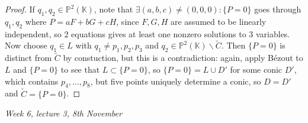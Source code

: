 \documentclass{article}
\newcommand{\K}{\mathbb{K}}
\newcommand{\p}{\mathbb{P}}
\theoremstyle{definition}
\begin{document}
\begin{proof}
If $q_1,q_2\in\p^2(\K)$, note that $\exists (a,b,c)\neq (0,0,0):\{P=0\}$ goes through $q_1,q_2$ where $P=aF+bG+cH$, since $F,G,H$ are assumed to be linearly independent, so 2 equations gives at least one nonzero solutions to 3 variables. Now choose $q_1\in L$ with $q_1\neq p_1,p_2,p_3$ and $q_2\in \p^2(\K)\backslash\widetilde C$. Then $\{P=0\}$ is distinct from $\widetilde C$ by constuction, but this is a contradiction: again, apply Bézout to $L$ and $\{P=0\}$ to see that $L\subset\{P=0\}$, so $\{P=0\}=L\cup D'$ for some conic $D'$, which contains $p_4,\ldots,p_8$, but five points uniquely determine a conic, so $D=D'$ and $\widetilde C=\{P=0\}$.
\end{proof}

\begin{flushright}
\textit{Week 6, lecture 3, 8th November}
\end{flushright}
\end{document}
